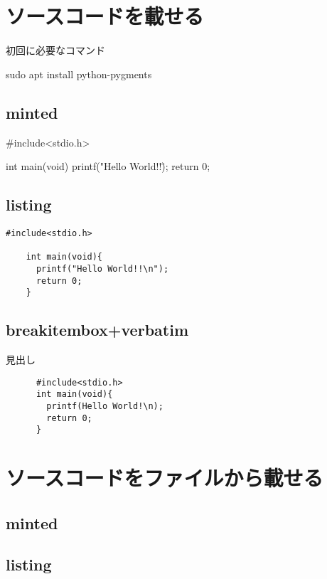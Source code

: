 \documentclass[a4j,titlepage,dvipdfmx]{jsarticle}   %
\begin{document}
  \section{ソースコードを載せる}
  \begin{listing}[htbp]
    \caption{初回に必要なコマンド}
    \begin{shellcode}
      sudo apt install python-pygments
    \end{shellcode}
  \end{listing}
  \subsection{minted}
  \begin{myMinted}
    #include<stdio.h>

    int main(void){
      printf("Hello World!!\");
      return 0;
    }
  \end{myMinted}

  \subsection{listing}
  \begin{lstlisting}[caption=listingのテスト,label=listTest]
    #include<stdio.h>

    int main(void){
      printf("Hello World!!\n");
      return 0;
    }
  \end{lstlisting}

  \subsection{breakitembox+verbatim}

  \begin{breakitembox}[l]{見出し}
    \begin{verbatim}
      #include<stdio.h>
      int main(void){
        printf(Hello World!\n);
        return 0;
      }
    \end{verbatim}
  \end{breakitembox}


\section{ソースコードをファイルから載せる}
\subsection{minted}

\subsection{listing}

\end{document}
